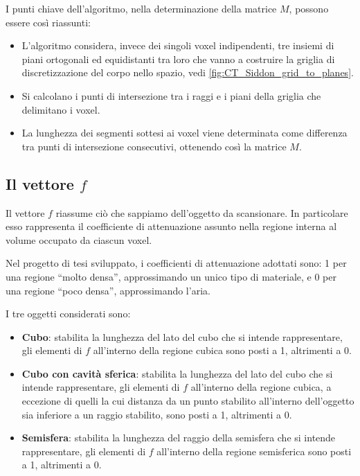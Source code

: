 \documentclass[12pt,a4paper]{report}
\begin{document}
I punti chiave dell'algoritmo, nella determinazione della matrice \(M\), possono essere così riassunti:
\begin{itemize}
  \item L'algoritmo considera, invece dei singoli voxel indipendenti, tre insiemi di piani ortogonali ed equidistanti tra loro che
        vanno a costruire la griglia di discretizzazione del corpo nello spazio, vedi \autoref{fig:CT_Siddon_grid_to_planes}.
  \item Si calcolano i punti di intersezione tra i raggi e i piani della griglia che delimitano i voxel.
  \item La lunghezza dei segmenti sottesi ai voxel viene determinata come differenza tra punti di intersezione consecutivi,
        ottenendo così la matrice \(M\).
\end{itemize}

\subsection{Il vettore \texorpdfstring{\(f\)}{f}} \label{subsec:vector_f}

Il vettore \(f\) riassume ciò che sappiamo dell'oggetto da scansionare.
In particolare esso rappresenta il coefficiente di attenuazione assunto nella regione interna al volume occupato da ciascun voxel.

Nel progetto di tesi sviluppato, i coefficienti di attenuazione adottati sono: 1 per una regione ``molto densa'', approssimando un
unico tipo di materiale, e 0 per una regione ``poco densa'', approssimando l'aria.

I tre oggetti considerati sono:
\begin{itemize}
  \item \textbf{Cubo}: stabilita la lunghezza del lato del cubo che si intende rappresentare, gli elementi di \(f\) all'interno
        della regione cubica sono posti a 1, altrimenti a 0.
  \item \textbf{Cubo con cavità sferica}: stabilita la lunghezza del lato del cubo che si intende rappresentare, gli elementi
        di \(f\) all'interno della regione cubica, a eccezione di quelli la cui distanza da un punto stabilito all'interno
        dell'oggetto sia inferiore a un raggio stabilito, sono posti a 1, altrimenti a 0.
  \item \textbf{Semisfera}: stabilita la lunghezza del raggio della semisfera che si intende rappresentare, gli elementi di
        \(f\) all'interno della regione semisferica sono posti a 1, altrimenti a 0.
\end{itemize}
\end{document}
